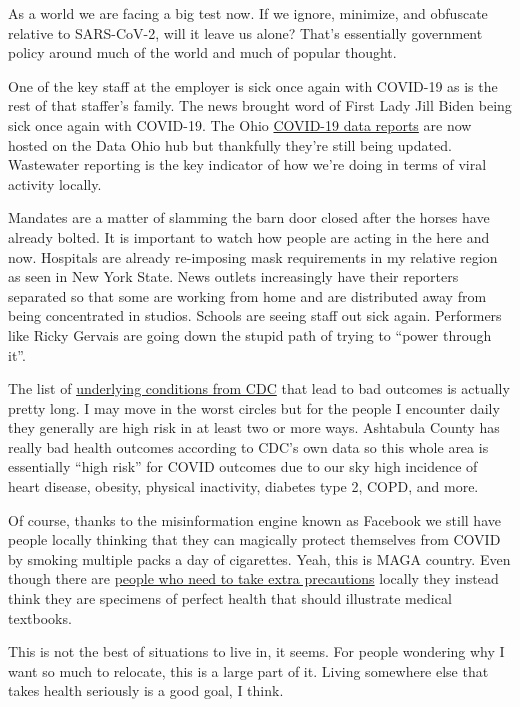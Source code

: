 As a world we are facing a big test now. If we ignore, minimize, and
obfuscate relative to SARS-CoV-2, will it leave us alone? That's
essentially government policy around much of the world and much of
popular thought.

One of the key staff at the employer is sick once again with COVID-19 as
is the rest of that staffer's family. The news brought word of First
Lady Jill Biden being sick once again with COVID-19. The Ohio
\href{https://data.ohio.gov/wps/portal/gov/data/view/covid-19-reporting}{COVID-19
data reports} are now hosted on the Data Ohio hub but thankfully they're
still being updated. Wastewater reporting is the key indicator of how
we're doing in terms of viral activity locally.

Mandates are a matter of slamming the barn door closed after the horses
have already bolted. It is important to watch how people are acting in
the here and now. Hospitals are already re-imposing mask requirements in
my relative region as seen in New York State. News outlets increasingly
have their reporters separated so that some are working from home and
are distributed away from being concentrated in studios. Schools are
seeing staff out sick again. Performers like Ricky Gervais are going
down the stupid path of trying to ``power through it''.

The list of
\href{https://www.cdc.gov/coronavirus/2019-ncov/hcp/clinical-care/underlyingconditions.html}{underlying
conditions from CDC} that lead to bad outcomes is actually pretty long.
I may move in the worst circles but for the people I encounter daily
they generally are high risk in at least two or more ways. Ashtabula
County has really bad health outcomes according to CDC's own data so
this whole area is essentially ``high risk'' for COVID outcomes due to
our sky high incidence of heart disease, obesity, physical inactivity,
diabetes type 2, COPD, and more.

Of course, thanks to the misinformation engine known as Facebook we
still have people locally thinking that they can magically protect
themselves from COVID by smoking multiple packs a day of cigarettes.
Yeah, this is MAGA country. Even though there are
\href{https://www.cdc.gov/coronavirus/2019-ncov/need-extra-precautions/people-with-medical-conditions.html}{people
who need to take extra precautions} locally they instead think they are
specimens of perfect health that should illustrate medical textbooks.

This is not the best of situations to live in, it seems. For people
wondering why I want so much to relocate, this is a large part of it.
Living somewhere else that takes health seriously is a good goal, I
think.
